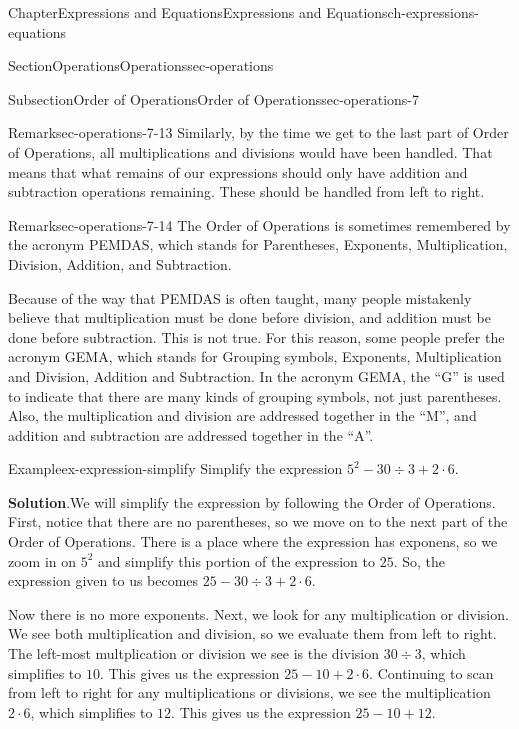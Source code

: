 \documentclass[twoside,11pt,]{book}
\newcommand{\blocktitlefont}{\relax}
\numberwithin{equation}{chapter}
\begin{document}
\begin{chapterptx}{Chapter}{Expressions and Equations}{}{Expressions and Equations}{}{}{ch-expressions-equations}
\begin{sectionptx}{Section}{Operations}{}{Operations}{}{}{sec-operations}
\begin{subsectionptx}{Subsection}{Order of Operations}{}{Order of Operations}{}{}{sec-operations-7}
\begin{remark}{Remark}{}{sec-operations-7-13}%
Similarly, by the time we get to the last part of Order of Operations, all multiplications and divisions would have been handled. That means that what remains of our expressions should only have addition and subtraction operations remaining. These should be handled from left to right.%
\end{remark}
\begin{remark}{Remark}{}{sec-operations-7-14}%
The Order of Operations is sometimes remembered by the acronym PEMDAS, which stands for Parentheses, Exponents, Multiplication, Division, Addition, and Subtraction.%
\par
Because of the way that PEMDAS is often taught, many people mistakenly believe that multiplication must be done before division, and addition must be done before subtraction. This is not true. For this reason, some people prefer the acronym GEMA, which stands for Grouping symbols, Exponents, Multiplication and Division, Addition and Subtraction. In the acronym GEMA, the ``G'' is used to indicate that there are many kinds of grouping symbols, not just parentheses. Also, the multiplication and division are addressed together in the ``M'', and addition and subtraction are addressed together in the ``A''.%
\end{remark}
\begin{example}{Example}{}{ex-expression-simplify}%
Simplify the expression \(5^2 - 30 \div 3 + 2 \cdot 6\).%
\par\smallskip%
\noindent\textbf{\blocktitlefont Solution}.\hypertarget{ex-expression-simplify-2}{}\quad{}We will simplify the expression by following the Order of Operations. First, notice that there are no parentheses, so we move on to the next part of the Order of Operations. There is a place where the expression has exponens, so we zoom in on \(5^2\) and simplify this portion of the expression to \(25\). So, the expression given to us becomes \(25 - 30 \div 3 + 2 \cdot 6\).%
\par
Now there is no more exponents. Next, we look for any multiplication or division. We see both multiplication and division, so we evaluate them from left to right. The left-most multplication or division we see is the division \(30 \div 3\), which simplifies to \(10\). This gives us the expression \(25 - 10 + 2 \cdot 6\). Continuing to scan from left to right for any multiplications or divisions, we see the multiplication \(2 \cdot 6\), which simplifies to \(12\). This gives us the expression \(25 - 10 + 12\).%

\end{example}
\end{subsectionptx}
\end{sectionptx}
\end{chapterptx}
\end{document}
